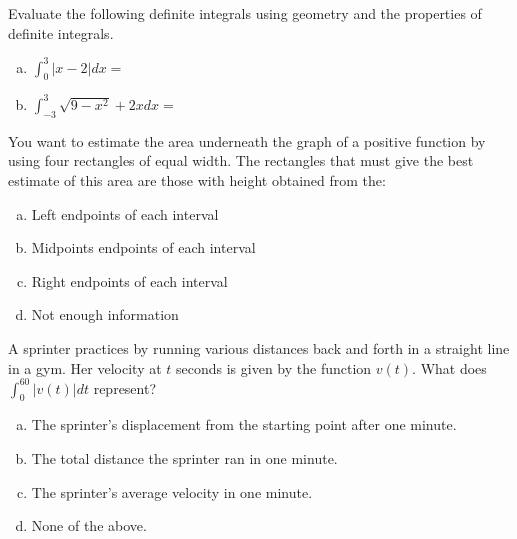 \documentclass[11 pt]{exam}
\begin{document}
\begin{questions}
\begin{enumerate}[(a)]
 	\hfill \break
 	\hfill \break
 	\hfill \break
  	\hfill \break
 \hfill \break
 \hfill \break	
 	
 \end{enumerate}


\question[16] Evaluate the following definite integrals using geometry and the properties of definite integrals.

\begin{enumerate}[(a)]
	
	
	\item $\displaystyle \int_{0}^{3} |x-2| dx = $\\

	
	\hfill \break
	\hfill \break
	\hfill \break
	
	\newpage
	
		\item $\displaystyle \int_{-3}^{3}\sqrt{9-x^2} + 2x dx = $\\

	\hfill \break
\hfill \break
\hfill \break
	\hfill \break
\hfill \break
\hfill \break	
	\hfill \break
\hfill \break
\hfill \break	
\end{enumerate}

\question[4] You want to estimate the area underneath the graph of a positive function by using four rectangles of equal width. The rectangles that must give the best estimate of this area are those with height obtained from the:


\begin{enumerate}[(a)]
	
	\item Left endpoints of each interval
	
	\item Midpoints endpoints of each interval
	
	\item Right endpoints of each interval
	
	\item Not enough information
	
\end{enumerate}

\vfill

\question[4] A sprinter practices by running various distances back and forth in a straight line in a gym. Her velocity at $t$ seconds is given by the function $v(t)$. What does $\int_{0}^{60} |v(t)| dt$ represent?

\begin{enumerate}[(a)]
	
	\item The sprinter\rq{}s displacement from the starting point after one minute.
	\item The total distance the sprinter ran in one minute.
	\item The sprinter\rq{}s average velocity in one minute.
	\item None of the above.
	
\end{enumerate}

\vfill

\end{questions}
\end{document}
